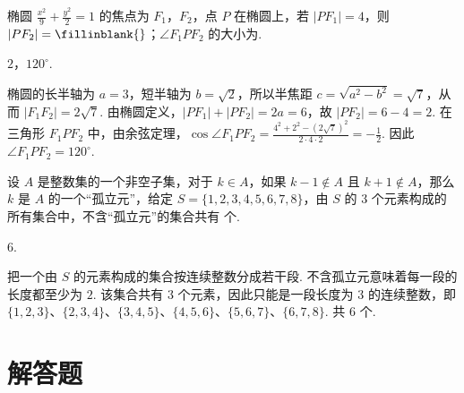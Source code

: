 \begin{problem}
椭圆 \(\frac{x^2}{9} + \frac{y^2}{2} = 1\) 的焦点为 \(F_1\)，\(F_2\)，点 \(P\) 在椭圆上，若 \(|PF_1| = 4\)，则 \(|PF_2| =\fillinblank{}\)；\(\angle F_1PF_2\) 的大小为\fillinblank{}.
\begin{answer}
\(2\)，\(120^{\circ}\).
\end{answer}

\begin{solution}
椭圆的长半轴为 \(a=3\)，短半轴为 \(b=\sqrt{2}\)，所以半焦距 \(c=\sqrt{a^2-b^2}=\sqrt7\)，从而 \(|F_1F_2|=2\sqrt7\). 由椭圆定义，\(|PF_1|+|PF_2|=2a=6\)，故 \(|PF_2|=6-4=2\). 在三角形 \(F_1PF_2\) 中，由余弦定理，\(\cos\angle F_1PF_2=\frac{4^2+2^2-(2\sqrt7)^2}{2\cdot4\cdot2}=-\frac12\). 因此 \(\angle F_1PF_2=120^{\circ}\).
\end{solution}
\end{problem}

\begin{problem}
设 \(A\) 是整数集的一个非空子集，对于 \(k \in A\)，如果 \(k - 1 \notin A\) 且 \(k + 1 \notin A\)，那么 \(k\) 是 \(A\) 的一个“孤立元”，给定 \(S = \{1, 2, 3, 4, 5, 6, 7, 8\}\)，由 \(S\) 的 3 个元素构成的所有集合中，不含“孤立元”的集合共有\fillinblank{} 个.
\begin{answer}
\(6\).
\end{answer}

\begin{solution}
把一个由 \(S\) 的元素构成的集合按连续整数分成若干段. 不含孤立元意味着每一段的长度都至少为 \(2\). 该集合共有 \(3\) 个元素，因此只能是一段长度为 \(3\) 的连续整数，即 \(\{1,2,3\}\)、\(\{2,3,4\}\)、\(\{3,4,5\}\)、\(\{4,5,6\}\)、\(\{5,6,7\}\)、\(\{6,7,8\}\). 共 \(6\) 个.
\end{solution}
\end{problem}

\section{解答题}

